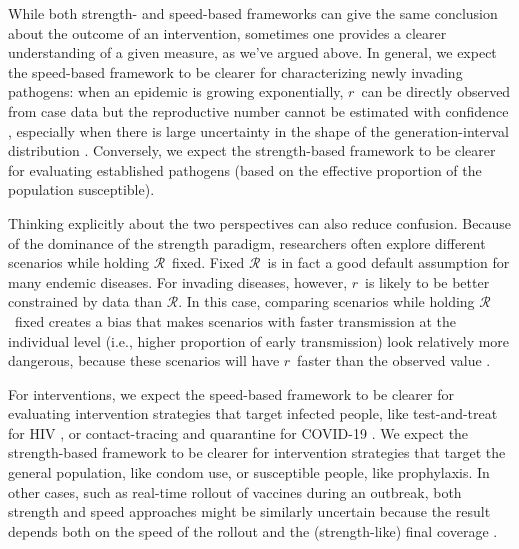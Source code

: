 \documentclass[12pt]{article}
\newcommand{\RR}{\ensuremath{{\mathcal R}}}
\newcommand{\rr}{\ensuremath{{r}}}
\begin{document}
While both strength- and speed-based frameworks can give the same conclusion about the outcome of an intervention, sometimes one provides a clearer understanding of a given measure, as we've argued above.
In general, we expect the speed-based framework to be clearer for characterizing newly invading pathogens: when an epidemic is growing exponentially, \rr\ can be directly observed from case data but the reproductive number cannot be estimated with confidence \citep{weitz2015modeling}, especially when there is large uncertainty in the shape of the generation-interval distribution \citep{park2020reconciling}.
Conversely, we expect the strength-based framework to be clearer for evaluating established pathogens (based on the effective proportion of the population susceptible).

Thinking explicitly about the two perspectives can also reduce confusion. Because of the dominance of the strength paradigm, researchers often explore different scenarios while holding \RR\ fixed. Fixed \RR\ is in fact a good default assumption for many endemic diseases. For invading diseases, however, \rr\ is likely to be better constrained by data than \RR. In this case, comparing scenarios while holding \RR\ fixed creates a bias that makes scenarios with faster transmission at the individual level (i.e., higher proportion of early transmission) look relatively more dangerous, because these scenarios will have \rr\ faster than the observed value \citep{eaton2014proportion, powers2014impact, park2019practical}.

For interventions, we expect the speed-based framework to be clearer for evaluating intervention strategies that target infected people, like test-and-treat for HIV \citep{granich2009universal}, or contact-tracing and quarantine for COVID-19 \citep{hellewell2020feasibility}. 
We expect the strength-based framework to be clearer for intervention strategies that target the general population, like condom use, or susceptible people, like prophylaxis.
In other cases, such as real-time rollout of vaccines during an outbreak, both strength and speed approaches might be similarly uncertain because the result depends both on the speed of the rollout and the (strength-like) final coverage \citep{shah2018mumps}.
\end{document}
